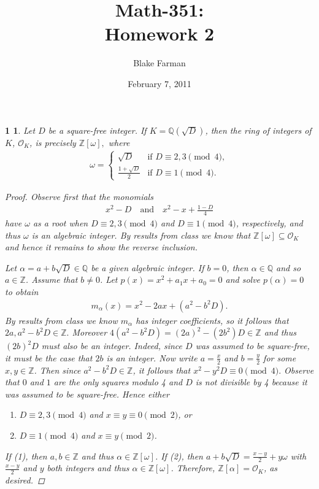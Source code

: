 \documentclass[10pt]{amsart}
\author{Blake Farman}
\title{Math-351:\\Homework 2}
\date{February 7, 2011}\pdfpagewidth 8.5in
\begin{document}
\maketitle

\renewcommand{\qedsymbol}{\(\blacksquare\)}
\newcommand{\znz}[1]{\mathbb{Z} / #1\mathbb{Z}}
\newcommand{\mznz}[1]{(\mathbb{Z} / #1\mathbb{Z})^*}
\newcommand{\Z}{\mathbb{Z}}
\newcommand{\Q}{\mathbb{Q}}

\newtheorem*{1}{1}
\begin{1}
  Let $D$ be a square-free integer.  If $K = \Q(\sqrt{D})$, then the ring of integers of $K$, $\mathcal{O}_K$, is precisely $\Z[\omega],$ where 
  \begin{align*}
    \omega = \begin{cases}
      \sqrt{D} & \text{if $D \equiv 2,3 \pmod{4}$},\\
      \frac{1 + \sqrt{D}}{2}& \text{if $D \equiv 1 \pmod{4}$}.
      \end{cases}
  \end{align*}
  \begin{proof}
    Observe first that the monomials
    \begin{align*}
      x^2 - D \quad \text{and} \quad x^2 - x + \frac{1 - D}{4}
    \end{align*}
    have $\omega$ as a root when $D \equiv 2,3 \pmod{4}$ and $D \equiv 1 \pmod{4}$, respectively, and thus $\omega$ is an algebraic integer.
    By results from class we know that $\Z[\omega] \subseteq \mathcal{O}_K$ and hence it remains to show the reverse inclusion.
    
    Let $\alpha = a + b\sqrt{D} \in \Q$ be a given algebraic integer.  
    If $b = 0$, then $\alpha \in \Q$ and so $a \in \Z$.
    Assume that $b \not = 0$.
    Let $p(x) = x^2 + a_1x + a_0 = 0$ and solve $p(\alpha) = 0$ to obtain 
    \begin{align*}
      m_{\alpha}(x) = x^2 -2ax + (a^2 - b^2D).
    \end{align*}
    By results from class we know $m_{\alpha}$ has integer coefficients, so it follows that $2a, a^2 - b^2D \in \Z.$
    Moreover $4(a^2 - b^2D) = (2a)^2 - (2b^2)D \in \Z$ and thus $(2b)^2D$ must also be an integer.
    Indeed, since $D$ was assumed to be square-free, it must be the case that $2b$ is an integer.
    Now write $a = \frac{x}{2}$ and $b = \frac{y}{2}$ for some $x,y \in \Z$.
    Then since $a^2 - b^2D \in \Z$, it follows that $x^2 - y^2D \equiv 0 \pmod{4}.$ 
    Observe that $0$ and $1$ are the only squares modulo 4 and $D$ is not divisible by 4 because it was assumed to be square-free. 
    Hence either
    \begin{enumerate}
    \item
      $D \equiv 2,3 \pmod{4}$ and $x \equiv y \equiv 0\pmod{2}$, or
    \item
      $D \equiv 1 \pmod{4}$ and $x \equiv y \pmod{2}$.
    \end{enumerate}
    If (1), then $a,b \in \Z$ and thus $\alpha \in \Z[\omega]$.  
    If (2), then $a + b\sqrt{D} = \frac{x - y}{2} + y\omega$ with $\frac{x-y}{2}$ and $y$ both integers and thus $\alpha \in \Z[\omega]$.
    Therefore, $\Z[\alpha] = \mathcal{O}_K$, as desired.
  \end{proof}
\end{1}
\end{document}
